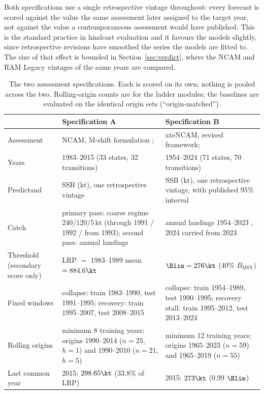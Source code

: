 Both specifications use a single retrospective vintage throughout: every forecast is scored against the value the same assessment later assigned to the target year, not against the value a contemporaneous assessment would have published. This is the standard practice in hindcast evaluation and it favours the models slightly, since retrospective revisions have smoothed the series the models are fitted to. The size of that effect is bounded in Section~\ref{sec:verdict}, where the NCAM and RAM Legacy vintages of the same years are compared.

\begin{table}[!htb]
\centering\small
\caption{The two assessment specifications. Each is scored on its own; nothing is pooled across the two. Rolling-origin counts are for the ladder modules; the baselines are evaluated on the identical origin sets (``origin-matched'').}
\label{tab:specs}
\begin{tabularx}{\textwidth}{@{}>{\raggedright\arraybackslash}p{}LL@{}}
\toprule
 & Specification A & Specification B \\
\midrule
Assessment & NCAM, M-shift formulation \citep{Cadigan2016}; \citet[Table A2]{DFO2016} & xteNCAM, revised framework; \citet[Table 17]{Regular2025} \\
Years & 1983--2015 (33 states, 32 transitions) & 1954--2024 (71 states, 70 transitions) \\
Predictand & SSB (kt), one retrospective vintage & SSB (kt), one retrospective vintage, with published 95\% interval \\
Catch & primary pass: coarse regime 240/120/5\,kt (through 1991 / 1992 / from 1993); second pass: annual landings \citep{Schijns2021} & annual landings 1954--2023 \citep[Table 1]{Regular2025}, 2024 carried from 2023 \\
Threshold (secondary score only) & LRP $=$ 1983--1989 mean $= 884.6\kt$ & $\Blim = 276\kt$ (40\% $B_{\mathrm{MSY}}$) \\
Fixed windows & collapse: train 1983--1990, test 1991--1995; recovery: train 1995--2007, test 2008--2015 & collapse: train 1954--1989, test 1990--1995; recovery stall: train 1995--2012, test 2013--2024 \\
Rolling origins & minimum 8 training years; origins 1990--2014 ($n=25$, $h=1$) and 1990--2010 ($n=21$, $h=5$) & minimum 12 training years; origins 1965--2023 ($n=59$) and 1965--2019 ($n=55$) \\
Last common year & 2015: $298.65\kt$ (33.8\% of LRP) & 2015: $273\kt$ (0.99 $\Blim$) \\
\bottomrule
\end{tabularx}
\end{table}


